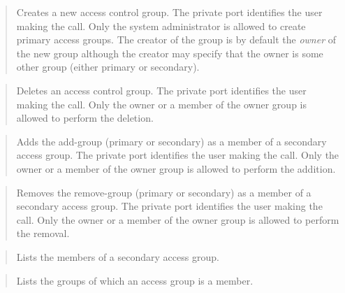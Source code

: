 \begin{quotation} 

Creates a new access control group.  The private port identifies the user
making the call.  Only the system administrator is allowed to create primary
access groups.  The creator of the group is by default the {\em owner\/} of
the new group although the creator may specify that the owner is some other
group (either primary or secondary).
\end{quotation}

\begin{quotation} 

Deletes an access control group.  The private port identifies the user
making the call.  Only the owner or a member of the owner group is allowed
to perform the deletion.
\end{quotation}

\begin{quotation} 

Adds the add-group (primary or secondary) as a member of a secondary access
group.  The private port identifies the user making the call.  Only the
owner or a member of the owner group is allowed to perform the addition.
\end{quotation}

\begin{quotation} 

Removes the remove-group (primary or secondary) as a member of a secondary
access group.  The private port identifies the user making the call.  Only
the owner or a member of the owner group is allowed to perform the removal.
\end{quotation}

\begin{quotation} 

Lists the members of a secondary access group.
\end{quotation}

\begin{quotation} 

Lists the groups of which an access group is a member.
\end{quotation}


